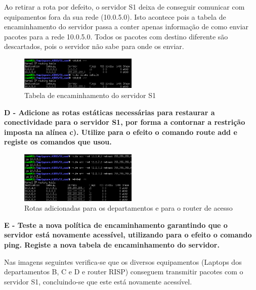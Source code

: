 \documentclass[11pt]{article}
\begin{document}
Ao retirar a rota por defeito, o servidor S1 deixa de conseguir comunicar com equipamentos fora da sua rede (10.0.5.0). Isto acontece pois a tabela de encaminhamento do servidor passa a conter apenas informação de como enviar pacotes para a rede 10.0.5.0. Todos os pacotes com destino diferente são descartados, pois o servidor não sabe para onde os enviar. 

\begin{figure}[!htb]
    \centering
    \includegraphics[width=0.5\textwidth]{images/parte2/serv1.png}
    \caption{Tabela de encaminhamento do servidor S1}
\end{figure}

\vspace{0.5cm}

\textbf{D - Adicione as rotas estáticas necessárias para restaurar a conectividade para o servidor S1, por forma a contornar a restrição imposta na alínea c). Utilize para o efeito o comando route add e registe os comandos que usou.}

\begin{figure}[!htb]
    \centering
    \includegraphics[width=0.5\textwidth]{images/parte2/add_rotas.png}
    \caption{Rotas adicionadas para os departamentos e para o router de acesso}
\end{figure}

\clearpage
\textbf{E - Teste a nova política de encaminhamento garantindo que o servidor está novamente acessível, utilizando para o efeito o comando ping. Registe a nova tabela de encaminhamento do servidor.}

Nas imagens seguintes verifica-se que os diversos equipamentos (Laptops dos departamentos B, C e D e router RISP) conseguem transmitir pacotes com o servidor S1, concluindo-se que este está novamente acessível.
\end{document}
